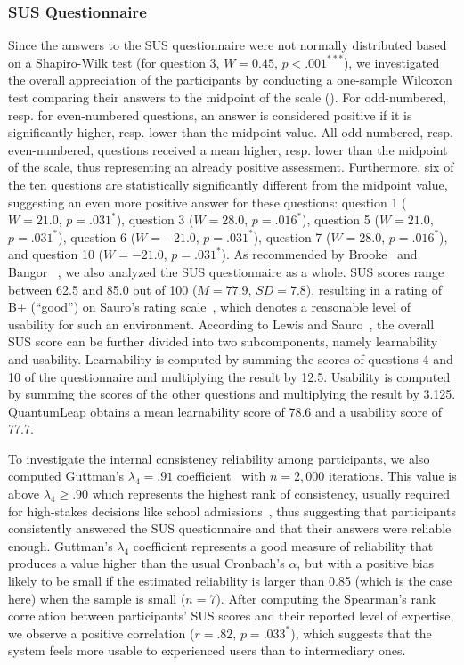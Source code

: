 \subsubsection{SUS Questionnaire}
Since the answers to the SUS questionnaire were not normally distributed based on a Shapiro-Wilk test (\eg for question 3, $W{=}0.45$, $p{<}.001^{***}$), we investigated the overall appreciation of the participants by conducting a one-sample Wilcoxon test comparing their answers to the midpoint of the scale (). For odd-numbered, resp. for even-numbered questions, an answer is considered positive if it is significantly higher, resp. lower than the midpoint value. All odd-numbered, resp. even-numbered, questions received a mean higher, resp. lower than the midpoint of the scale, thus representing an already positive assessment. Furthermore, six of the ten questions are statistically significantly different from the midpoint value, suggesting an even more positive answer for these questions: question 1 ($W{=}21.0$, $p{=}.031^*$), question 3 ($W{=}28.0$, $p{=}.016^*$), question 5 ($W{=}21.0$, $p{=}.031^*$), question 6 ($W{=}{-}21.0$, $p{=}.031^*$), question 7 ($W{=}28.0$, $p{=}.016^*$), and question 10 ($W{=}{-}21.0$, $p{=}.031^*$).
As recommended by Brooke~\cite{Brooke:1996} and Bangor \etal~\cite{Bangor:2008}, we also analyzed the SUS questionnaire as a whole. SUS scores range between 62.5 and 85.0 out of 100 ($M{=}77.9$, $SD{=}7.8$), resulting in a rating of B+ (``good'') on Sauro's rating scale~\cite{Sauro:2010}, which denotes a reasonable level of usability for such an environment. According to Lewis and Sauro~\cite{Lewis:2009}, the overall SUS score can be further divided into two subcomponents, namely learnability and usability. Learnability is computed by summing the scores of questions 4 and 10 of the questionnaire and multiplying the result by 12.5. Usability is computed by summing the scores of the other questions and multiplying the result by 3.125. QuantumLeap obtains a mean learnability score of 78.6 and a usability score of 77.7. 

To investigate the internal consistency reliability among participants, we also computed Guttman's $\lambda_4{=}.91$ coefficient~\cite{Guttman:1945} with $n{=}2,000$ iterations. This value is above $\lambda_4{\geq}.90$ which represents the highest rank of consistency, usually required for high-stakes decisions like school admissions~\cite{Callender:1979}, thus suggesting that participants consistently answered the SUS questionnaire and that their answers were reliable enough.
Guttman’s $\lambda_4$ coefficient represents a good measure of reliability that produces a  value higher than the usual Cronbach’s $\alpha$, but with a positive bias likely to be small if the estimated reliability is larger than 0.85 (which is the case here) when the sample is small ($n{=}7$). After computing the Spearman's rank correlation between participants' SUS scores and their reported level of expertise, we observe a positive correlation ($r{=}.82$, $p{=}.033^*$), which suggests that the system feels more usable to experienced users than to intermediary ones.

